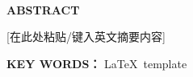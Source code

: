 \begin{center}
	\vspace*{-3.8mm}
	\fontsize{16}{16}\textbf{\myengtitle}\\
	\vspace{20.5mm}
	\fontsize{15}{15}
	\textbf{ABSTRACT}
\end{center}
\vspace{7.6mm}
\fontsize{14}{20}\selectfont
\noindent\phantom{空格}%
[在此处粘贴/键入英文摘要内容]


\vspace{16.2mm}
\noindent\hspace{10.6mm}%
\textbf{KEY WORDS：}%
\LaTeX\ template
